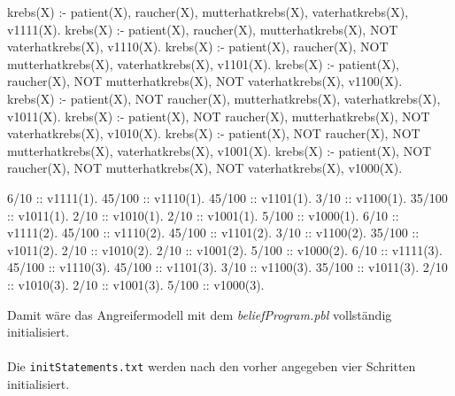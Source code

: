 \documentclass[german,version-2020-11]{uzl-thesis}
\begin{document}
\begin{Pseudocode}[caption={Beispiel für Knoten mit Abhängigkeiten }, label={lst-abhangig}, numbers=left]
krebs(X) :- patient(X), raucher(X), mutterhatkrebs(X), vaterhatkrebs(X), v1111(X).
krebs(X) :- patient(X), raucher(X), mutterhatkrebs(X), NOT vaterhatkrebs(X), v1110(X).
krebs(X) :- patient(X), raucher(X), NOT mutterhatkrebs(X), vaterhatkrebs(X), v1101(X).
krebs(X) :- patient(X), raucher(X), NOT mutterhatkrebs(X), NOT vaterhatkrebs(X), v1100(X).
krebs(X) :- patient(X), NOT raucher(X), mutterhatkrebs(X), vaterhatkrebs(X), v1011(X).
krebs(X) :- patient(X), NOT raucher(X), mutterhatkrebs(X), NOT vaterhatkrebs(X), v1010(X).
krebs(X) :- patient(X), NOT raucher(X), NOT mutterhatkrebs(X), vaterhatkrebs(X), v1001(X).
krebs(X) :- patient(X), NOT raucher(X), NOT mutterhatkrebs(X), NOT vaterhatkrebs(X), v1000(X).

6/10 :: v1111(1).
45/100 :: v1110(1).
45/100 :: v1101(1).
3/10 :: v1100(1).
35/100 :: v1011(1).
2/10 :: v1010(1).
2/10 :: v1001(1).
5/100 :: v1000(1).
6/10 :: v1111(2).
45/100 :: v1110(2).
45/100 :: v1101(2).
3/10 :: v1100(2).
35/100 :: v1011(2).
2/10 :: v1010(2).
2/10 :: v1001(2).
5/100 :: v1000(2).
6/10 :: v1111(3).
45/100 :: v1110(3).
45/100 :: v1101(3).
3/10 :: v1100(3).
35/100 :: v1011(3).
2/10 :: v1010(3).
2/10 :: v1001(3).
5/100 :: v1000(3).
\end{Pseudocode}
Damit wäre das Angreifermodell mit dem \textit{beliefProgram.pbl} vollständig initialisiert.\\ \\
Die \texttt{initStatements.txt} werden nach den vorher angegeben vier Schritten initialisiert.
\end{document}
